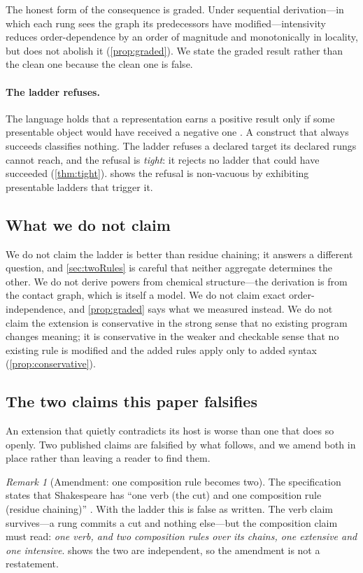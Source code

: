 \documentclass[11pt,twocolumn,a4paper]{article}
\theoremstyle{plain}
\theoremstyle{definition}
\theoremstyle{remark}
\newtheorem{remark}[theorem]{Remark}
\begin{document}
The honest form of the consequence is graded. Under sequential derivation---in
which each rung sees the graph its predecessors have modified---intensivity
reduces order-dependence by an order of magnitude and monotonically in
locality, but does not abolish it (\cref{prop:graded}). We state the graded
result rather than the clean one because the clean one is false.

\paragraph{The ladder refuses.} The language holds that a representation earns
a positive result only if some presentable object would have received a
negative one \citep{sachikonye2026medium}. A construct that always succeeds
classifies nothing. The ladder refuses a declared target its declared rungs
cannot reach, and the refusal is \emph{tight}: it rejects no ladder that could
have succeeded (\cref{thm:tight}).  shows the refusal is
non-vacuous by exhibiting presentable ladders that trigger it.

\subsection{What we do not claim}

We do not claim the ladder is better than residue chaining; it answers a
different question, and \cref{sec:twoRules} is careful that neither aggregate
determines the other. We do not derive powers from chemical structure---the
derivation is from the contact graph, which is itself a model. We do not claim
exact order-independence, and \cref{prop:graded} says what we measured instead.
We do not claim the extension is conservative in the strong sense that no
existing program changes meaning; it is conservative in the weaker and checkable
sense that no existing rule is modified and the added rules apply only to added
syntax (\cref{prop:conservative}).

\subsection{The two claims this paper falsifies}

An extension that quietly contradicts its host is worse than one that does so
openly. Two published claims are falsified by what follows, and we amend both
in place rather than leaving a reader to find them.

\begin{remark}[Amendment: one composition rule becomes two]
\label{rem:amend-composition}
The specification states that Shakespeare has ``one verb (the cut) and one
composition rule (residue chaining)''
\citep{sachikonye2026shakespeare}. With the ladder this is false as written.
The verb claim survives---a rung commits a cut and nothing else---but the
composition claim must read: \emph{one verb, and two composition rules over its
chains, one extensive and one intensive}.  shows the two are
independent, so the amendment is not a restatement.
\end{remark}
\end{document}
